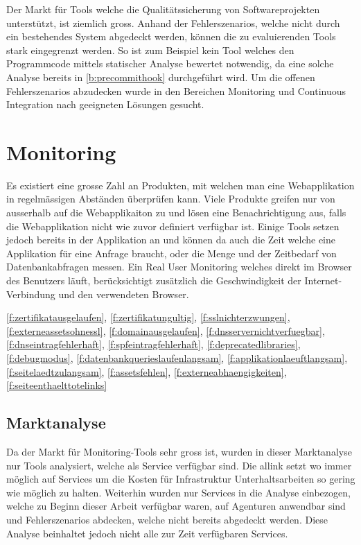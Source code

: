 
Der Markt für Tools welche die Qualitätssicherung von Softwareprojekten unterstützt, ist ziemlich gross. Anhand der Fehlerszenarios, welche nicht durch ein bestehendes System abgedeckt werden, können die zu evaluierenden Tools stark eingegrenzt werden. So ist zum Beispiel kein Tool welches den Programmcode mittels statischer Analyse bewertet notwendig, da eine solche Analyse bereits in \ref{b:precommithook} durchgeführt wird. Um die offenen Fehlerszenarios abzudecken wurde in den Bereichen Monitoring und Continuous Integration nach geeigneten Lösungen gesucht.

\section{Monitoring}
\label{sec:monitoring_evaluation}
Es existiert eine grosse Zahl an Produkten, mit welchen man eine Webapplikation in regelmässigen Abständen überprüfen kann. Viele Produkte greifen nur von ausserhalb auf die Webapplikaiton zu und lösen eine Benachrichtigung aus, falls die Webapplikation nicht wie zuvor definiert verfügbar ist. Einige Tools setzen jedoch bereits in der Applikation an und können da auch die Zeit welche eine Applikation für eine Anfrage braucht, oder die Menge und der Zeitbedarf von Datenbankabfragen messen. Ein Real User Monitoring welches direkt im Browser des Benutzers läuft, berücksichtigt zusätzlich die Geschwindigkeit der Internet-Verbindung und den verwendeten Browser.

\ref{f:zertifikatausgelaufen}, \ref{f:zertifikatungultig}, \ref{f:sslnichterzwungen}, \ref{f:externeassetsohnessl}, \ref{f:domainausgelaufen}, \ref{f:dnsservernichtverfuegbar}, \ref{f:dnseintragfehlerhaft}, \ref{f:spfeintragfehlerhaft}, \ref{f:deprecatedlibraries}, \ref{f:debugmodus}, \ref{f:datenbankquerieslaufenlangsam}, \ref{f:applikationlaeuftlangsam}, \ref{f:seitelaedtzulangsam}, \ref{f:assetsfehlen}, \ref{f:externeabhaengigkeiten}, \ref{f:seiteenthaelttotelinks}

\subsection{Marktanalyse}
\label{sub:marktanalyse}
Da der Markt für Monitoring-Tools sehr gross ist, wurden in dieser Marktanalyse nur Tools analysiert, welche als Service verfügbar sind. Die allink setzt wo immer möglich auf Services um die Kosten für Infrastruktur Unterhaltsarbeiten so gering wie möglich zu halten. Weiterhin wurden nur Services in die Analyse einbezogen, welche zu Beginn dieser Arbeit verfügbar waren, auf Agenturen anwendbar sind und Fehlerszenarios abdecken, welche nicht bereits abgedeckt werden. Diese Analyse beinhaltet jedoch nicht alle zur Zeit verfügbaren Services.

